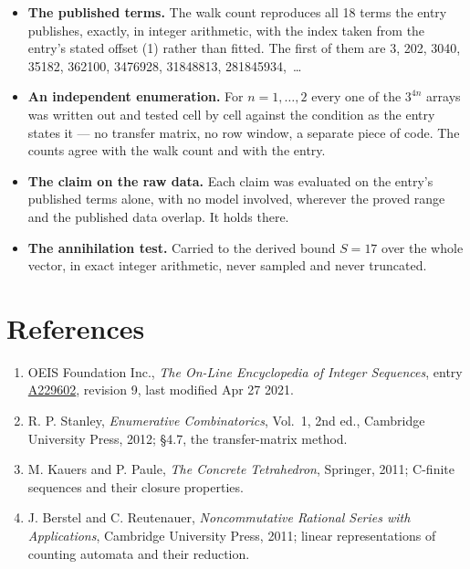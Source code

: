 \documentclass[11pt]{article}
\theoremstyle{definition}
\begin{document}
\begin{itemize}

\item {\bfseries The published terms.} The walk count reproduces all 18 terms the entry publishes, exactly, in integer arithmetic, with the index taken from the entry's stated offset (1) rather than fitted. The first of them are 3, 202, 3040, 35182, 362100, 3476928, 31848813, 281845934,~\dots

\item {\bfseries An independent enumeration.} For $n = 1,\dots,2$ every one of the $3^{4n}$ arrays was written out and tested cell by cell against the condition as the entry states it --- no transfer matrix, no row window, a separate piece of code. The counts agree with the walk count and with the entry.

\item {\bfseries The claim on the raw data.} Each claim was evaluated on the entry's published terms alone, with no model involved, wherever the proved range and the published data overlap. It holds there.

\item {\bfseries The annihilation test.} Carried to the derived bound $S = 17$ over the whole vector, in exact integer arithmetic, never sampled and never truncated.

\end{itemize}

\section{References}

\begin{enumerate}

\item OEIS Foundation Inc., \emph{The On-Line Encyclopedia of Integer Sequences}, entry \href{https://oeis.org/A229602}{A229602}, revision 9, last modified Apr 27 2021.

\item R. P. Stanley, \emph{Enumerative Combinatorics}, Vol.~1, 2nd ed., Cambridge University Press, 2012; \S4.7, the transfer-matrix method.

\item M. Kauers and P. Paule, \emph{The Concrete Tetrahedron}, Springer, 2011; C-finite sequences and their closure properties.

\item J. Berstel and C. Reutenauer, \emph{Noncommutative Rational Series with Applications}, Cambridge University Press, 2011; linear representations of counting automata and their reduction.

\end{enumerate}
\end{document}
